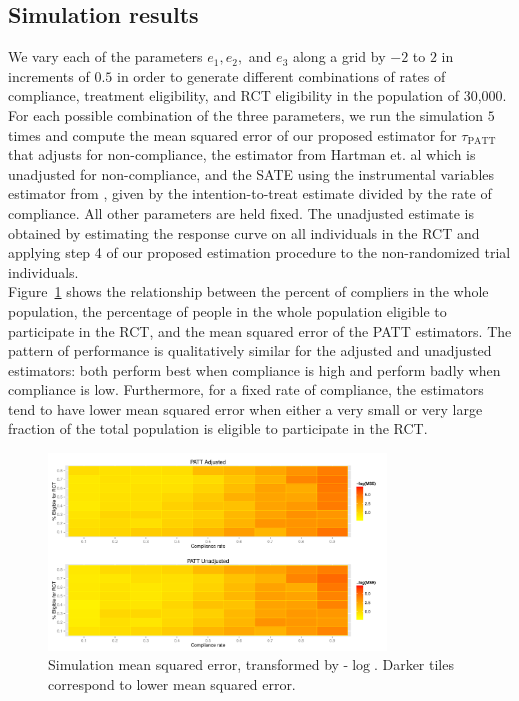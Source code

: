 \documentclass[12pt]{article}
\begin{document}
\subsection{Simulation results}

We vary each of the parameters $e_1, e_2,$ and $e_3$ along a grid by $-2$ to $2$ in increments of $0.5$ in order to generate different combinations of rates of compliance, treatment eligibility, and RCT eligibility in the population of 30,000.  For each possible combination of the three parameters, we run the simulation $5$ times and compute the mean squared error of our proposed estimator for $\tau_{\text{PATT}}$ that adjusts for non-compliance, the estimator from Hartman et. al which is unadjusted for non-compliance, and the SATE using the instrumental variables estimator from \cite{Angrist1996}, given by the intention-to-treat estimate divided by the rate of compliance.  All other parameters are held fixed. The unadjusted estimate is obtained by estimating the response curve on all individuals in the RCT and applying step 4 of our proposed estimation procedure to the non-randomized trial individuals. \\

Figure~\ref{fig:sim_tiles} shows the relationship between the percent of compliers in the whole population, the percentage of people in the whole population eligible to participate in the RCT, and the mean squared error of the PATT estimators.  The pattern of performance is qualitatively similar for the adjusted and unadjusted estimators: both perform best when compliance is high and perform badly when compliance is low.  Furthermore, for a fixed rate of compliance, the estimators tend to have lower mean squared error when either a very small or very large fraction of the total population is eligible to participate in the RCT. \\



\begin{figure}[htbp]
\begin{center}
\includegraphics[width = 0.8\textwidth]{mse_ratec_rates_B5}
\caption{Simulation mean squared error, transformed by -$\log$. Darker tiles correspond to lower mean squared error.}
\label{fig:sim_tiles}
\end{center}
\end{figure}
\end{document}
